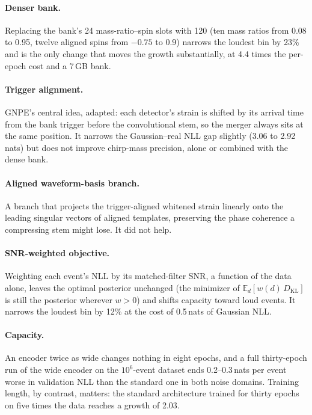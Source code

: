 \documentclass[twocolumn,linenumbers]{aastex701}
\newcommand{\dkl}{D_{\mathrm{KL}}}
\begin{document}
\paragraph{Denser bank.} Replacing the bank's 24 mass-ratio--spin slots with
120 (ten mass ratios from 0.08 to 0.95, twelve aligned spins from $-0.75$ to
0.9) narrows the loudest bin by 23\% and is the only change that moves the
growth substantially, at 4.4 times the per-epoch cost and a 7\,GB bank.

\paragraph{Trigger alignment.} GNPE's central idea, adapted: each detector's
strain is shifted by its arrival time from the bank trigger before the
convolutional stem, so the merger always sits at the same position. It
narrows the Gaussian--real NLL gap slightly (3.06 to 2.92\,nats) but does not
improve chirp-mass precision, alone or combined with the dense bank.

\paragraph{Aligned waveform-basis branch.} A branch that projects the
trigger-aligned whitened strain linearly onto the leading singular vectors of
aligned templates, preserving the phase coherence a compressing stem might
lose. It did not help.

\paragraph{SNR-weighted objective.} Weighting each event's NLL by its
matched-filter SNR, a function of the data alone, leaves the optimal posterior
unchanged (the minimizer of $\mathbb{E}_d[w(d)\,\dkl]$ is still the posterior
wherever $w>0$) and shifts capacity toward loud events. It narrows the loudest
bin by 12\% at the cost of 0.5\,nats of Gaussian NLL.

\paragraph{Capacity.} An encoder twice as wide changes nothing in eight epochs,
and a full thirty-epoch run of the wide encoder on the $10^6$-event dataset
ends 0.2--0.3\,nats per event worse in validation NLL than the standard one
in both noise domains.
Training length, by contrast, matters: the standard architecture trained for
thirty epochs on five times the data reaches a growth of 2.03.
\end{document}
